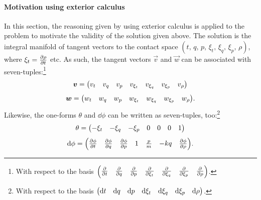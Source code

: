 \paragraph{Motivation using exterior calculus}
In this section, the reasoning given by \citet{Burke1985} using exterior calculus is applied to the problem to motivate the validity of the solution given above. The solution is the integral manifold of tangent vectors to the contact space $(t,\,q,\,p,\,\xi_t,\,\xi_q,\,\xi_p,\,\rho)$, where $\xi_t = \pdv{\rho}{t}$ etc. As such, the tangent vectors $\vec{v}$ and $\vec{w}$ can be associated with seven-tuples:\footnote{With respect to the basis $\mqty(\pdv{}{t} & \pdv{}{q} & \pdv{}{p} & \pdv{}{\xi_t} & \pdv{}{\xi_q} & \pdv{}{\xi_p} & \pdv{}{\rho})$.}
$$\vec{v} = \mqty(v_t & v_q & v_p & v_{\xi_t} & v_{\xi_q} & v_{\xi_p} & v_{\rho})$$
$$\vec{w} = \mqty(w_t & w_q & w_p & w_{\xi_t} & w_{\xi_q} & w_{\xi_p} & w_{\rho}).$$
Likewise, the one-forms $\theta$ and $\dd{\phi}$ can be written as seven-tuples, too:\footnote{With respect to the basis $\mqty(\dd{t} & \dd{q} & \dd{p} & \dd{\xi_t} & \dd{\xi_q} & \dd{\xi_p} & \dd{\rho})$.}
$$\theta = \mqty(-\xi_t & -\xi_q & -\xi_p & 0 & 0 & 0 & 1)$$
$$\dd{\phi} = \mqty(\pdv{\phi}{t} & \pdv{\phi}{q} & \pdv{\phi}{p} & 1 & \frac{p}{m} & -kq & \pdv{\phi}{\rho}).$$

